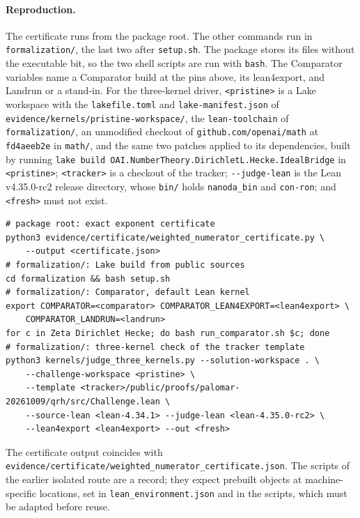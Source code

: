 \documentclass[11pt]{article}
\begin{document}
\paragraph{Reproduction.}
The certificate runs from the package root. The other commands run in
\nolinkurl{formalization/}, the last two after \nolinkurl{setup.sh}. The
package stores its files without the executable bit, so the two shell
scripts are run with \texttt{bash}. The Comparator variables name a Comparator build at the pins above, its
lean4export, and Landrun or a stand-in. For the three-kernel driver,
\nolinkurl{<pristine>} is a Lake workspace with the
\nolinkurl{lakefile.toml} and \nolinkurl{lake-manifest.json} of
\nolinkurl{evidence/kernels/pristine-workspace/}, the
\nolinkurl{lean-toolchain} of \nolinkurl{formalization/}, an unmodified
checkout of \nolinkurl{github.com/openai/math} at \nolinkurl{fd4aeeb2e} in
\nolinkurl{math/}, and the same two patches applied to its dependencies,
built by running \texttt{lake build OAI.NumberTheory.DirichletL.Hecke.IdealBridge}
in \nolinkurl{<pristine>}; \nolinkurl{<tracker>} is a checkout of the
tracker; \nolinkurl{--judge-lean} is the Lean v4.35.0-rc2 release
directory, whose \nolinkurl{bin/} holds \nolinkurl{nanoda_bin} and
\nolinkurl{con-ron}; and \nolinkurl{<fresh>} must not exist.
\par\endgroup
{\small
\begin{verbatim}
# package root: exact exponent certificate
python3 evidence/certificate/weighted_numerator_certificate.py \
    --output <certificate.json>
# formalization/: Lake build from public sources
cd formalization && bash setup.sh
# formalization/: Comparator, default Lean kernel
export COMPARATOR=<comparator> COMPARATOR_LEAN4EXPORT=<lean4export> \
    COMPARATOR_LANDRUN=<landrun>
for c in Zeta Dirichlet Hecke; do bash run_comparator.sh $c; done
# formalization/: three-kernel check of the tracker template
python3 kernels/judge_three_kernels.py --solution-workspace . \
    --challenge-workspace <pristine> \
    --template <tracker>/public/proofs/palomar-20261009/qrh/src/Challenge.lean \
    --source-lean <lean-4.34.1> --judge-lean <lean-4.35.0-rc2> \
    --lean4export <lean4export> --out <fresh>
\end{verbatim}}
{\raggedright\noindent
The certificate output coincides with
\nolinkurl{evidence/certificate/weighted_numerator_certificate.json}.
The scripts of the earlier isolated route are a record; they expect
prebuilt objects at machine-specific locations, set in
\nolinkurl{lean_environment.json} and in the scripts, which must be
adapted before reuse.\par}
\end{document}

